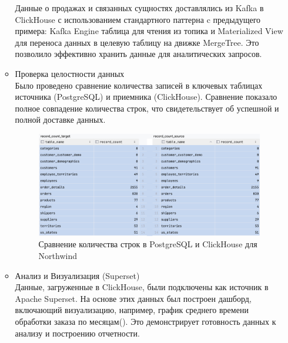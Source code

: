 \begin{enumerate}[1.]
\begin{itemize}
                Данные о продажах и связанных сущностях доставлялись из Kafka в ClickHouse с использованием стандартного паттерна c предыдущего примера: Kafka Engine таблица для чтения из топика и Materialized View для переноса данных в целевую таблицу на движке MergeTree. Это позволило эффективно хранить данные для аналитических запросов.
          \item Проверка целостности данных\\
                Было проведено сравнение количества записей в ключевых таблицах источника (PostgreSQL) и приемника (ClickHouse). Сравнение показало полное совпадение количества строк, что свидетельствует об успешной и полной доставке данных.
                \begin{figure}[h]
                  \center
                  \includegraphics [scale=0.5] {my_folder/images/ex1_tables_ch_pg_compraring}
                  \caption{Сравнение количества строк в PostgreSQL и ClickHouse для Northwind}
                  \label{fig:ex1_tables_ch_pg_compraring}
                \end{figure}
                \FloatBarrier
          \item Анализ и Визуализация (Superset)\\
                Данные, загруженные в ClickHouse, были подключены как источник в Apache Superset. На основе этих данных был построен дашборд, включающий визуализацию, например, график среднего времени обработки заказа по месяцам(). Это демонстрирует готовность данных к анализу и построению отчетности.                    \begin{figure}[h]
                  \center

\end{figure}
\end{itemize}
\end{enumerate}
